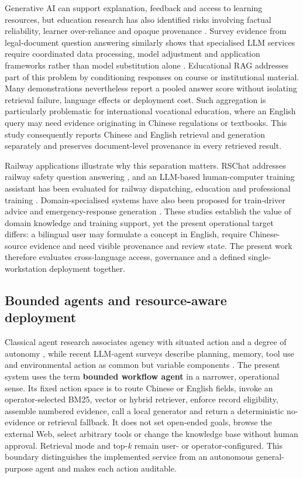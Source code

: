 Generative AI can support explanation, feedback and access to learning resources, but education research has also identified risks involving factual reliability, learner over-reliance and opaque provenance \citep{kasneci2023chatgpt,unesco2023guidance}. Survey evidence from legal-document question answering similarly shows that specialised LLM services require coordinated data processing, model adjustment and application frameworks rather than model substitution alone \citep{yang2024legalqa}. Educational RAG addresses part of this problem by conditioning responses on course or institutional material. Many demonstrations nevertheless report a pooled answer score without isolating retrieval failure, language effects or deployment cost. Such aggregation is particularly problematic for international vocational education, where an English query may need evidence originating in Chinese regulations or textbooks. This study consequently reports Chinese and English retrieval and generation separately and preserves document-level provenance in every retrieved result.

Railway applications illustrate why this separation matters. RSChat addresses railway safety question answering \citep{li2024rschat}, and an LLM-based human-computer training assistant has been evaluated for railway dispatching, education and professional training \citep{li2025training}. Domain-specialised systems have also been proposed for train-driver advice and emergency-response generation \citep{luo2025driver,huang2026emergency}. These studies establish the value of domain knowledge and training support, yet the present operational target differs: a bilingual user may formulate a concept in English, require Chinese-source evidence and need visible provenance and review state. The present work therefore evaluates cross-language access, governance and a defined single-workstation deployment together.

\subsection{Bounded agents and resource-aware deployment}

Classical agent research associates agency with situated action and a degree of autonomy \citep{wooldridge1995agents}, while recent LLM-agent surveys describe planning, memory, tool use and environmental action as common but variable components \citep{xi2025agents}. The present system uses the term \textbf{bounded workflow agent} in a narrower, operational sense. Its fixed action space is to route Chinese or English fields, invoke an operator-selected BM25, vector or hybrid retriever, enforce record eligibility, assemble numbered evidence, call a local generator and return a deterministic no-evidence or retrieval fallback. It does not set open-ended goals, browse the external Web, select arbitrary tools or change the knowledge base without human approval. Retrieval mode and top-\emph{k} remain user- or operator-configured. This boundary distinguishes the implemented service from an autonomous general-purpose agent and makes each action auditable.

